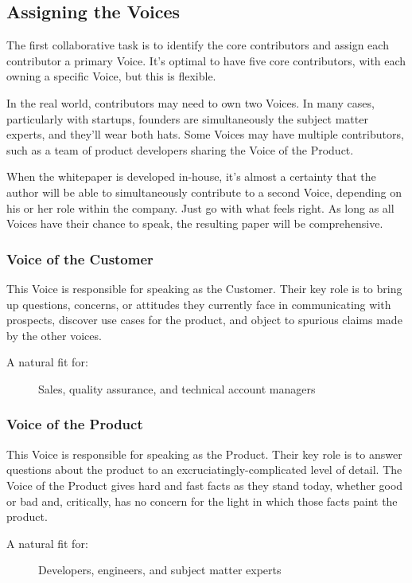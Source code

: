 \documentclass[letterpaper]{article}
\begin{document}
\subsection{Assigning the Voices}
The first collaborative task is to identify the core contributors and assign each contributor a primary Voice. It's optimal to have five core contributors, with each owning a specific Voice, but this is flexible. 

In the real world, contributors may need to own two Voices. In many cases, particularly with startups, founders are simultaneously the subject matter experts, and they'll wear both hats. Some Voices may have multiple contributors, such as a team of product developers sharing the Voice of the Product.

When the whitepaper is developed in-house, it's almost a certainty that the author will be able to simultaneously contribute to a second Voice, depending on his or her role within the company. Just go with what feels right. As long as all Voices have their chance to speak, the resulting paper will be comprehensive.

    \subsubsection{Voice of the Customer}
    This Voice is responsible for speaking as the Customer. Their key role is to bring up questions, concerns, or attitudes they currently face in communicating with prospects, discover use cases for the product, and object to spurious claims made by the other voices.
    \begin{description}
        \item[A natural fit for:] Sales, quality assurance, and technical account managers
    \end{description}

    \subsubsection{Voice of the Product}
    This Voice is responsible for speaking as the Product. Their key role is to answer questions about the product to an excruciatingly-complicated level of detail. The Voice of the Product gives hard and fast facts as they stand today, whether good or bad and, critically, has no concern for the light in which those facts paint the product.
    \begin{description}
        \item[A natural fit for:] Developers, engineers, and subject matter experts
    \end{description}
\end{document}
